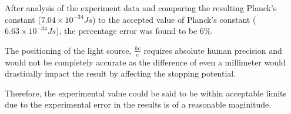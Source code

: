 

{After analysis of the experiment data and comparing the resulting Planck’s constant ($7.04\times10^{-34}Js$) to the accepted value of Planck’s constant ($6.63\times10^{-34}Js$), the percentage error was found to be 6\%.}

{The positioning of the light source, $\frac{hc}{e}$ requires absolute human precision and would not be completely accurate as the difference of even a millimeter would drastically impact the result by affecting the stopping potential.}

{Therefore, the experimental value could be said to be within acceptable limits due to the experimental error in the results is of a reasonable maginitude.}

{}

{}

{}

{}

{}

{}

{}

{}


